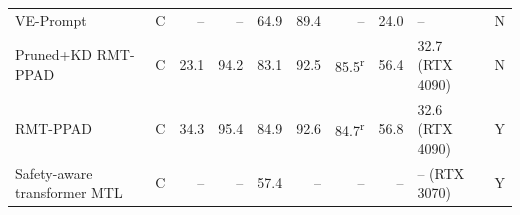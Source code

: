 \begin{table}[!htbp]
\begin{tabularx}{\linewidth}{L{3.3cm} c r r r r r r X c}
VE-Prompt~\cite{liang2023veprompt} & C & -- & -- & 64.9 & 89.4 & -- & 24.0 & -- & N \\
Pruned+KD RMT-PPAD~\cite{compress2025} & C & 23.1 & 94.2 & 83.1 & 92.5 & 85.5\textsuperscript{r} & 56.4 & 32.7 (RTX 4090) & N \\
RMT-PPAD~\cite{wang2026rmtppad} & C & 34.3 & 95.4 & 84.9 & 92.6 & 84.7\textsuperscript{r} & 56.8 & 32.6 (RTX 4090) & Y \\
Safety-aware transformer MTL~\cite{selvarajan2026safety} & C & -- & -- & 57.4 & -- & -- & -- & -- (RTX 3070) & Y \\
\bottomrule
\end{tabularx}
\end{table}
